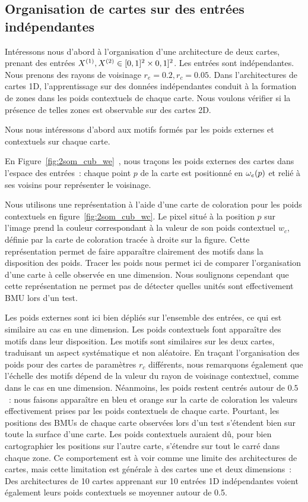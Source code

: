 \documentclass[../main]{subfiles}
\begin{document}
\subsection{Organisation de cartes sur des entrées indépendantes}

Intéressons nous d'abord à l'organisation d'une architecture de deux cartes, prenant des entrées $X^{({1})}, X^{({2})} \in [0,1]^2 \times 0,1]^2$. Les entrées sont indépendantes. Nous prenons des rayons de voisinage $r_e = 0.2, r_c = 0.05$.
Dans l'architectures de cartes 1D, l'apprentissage sur des données indépendantes conduit à la formation de zones dans les poids contextuels de chaque carte. Nous voulons vérifier si la présence de telles zones est observable sur des cartes 2D.

Nous nous intéressons d'abord aux motifs formés par les poids externes et contextuels sur chaque carte.

En Figure~\ref{fig:2som_cub_we}~, nous traçons les poids externes des cartes dans l'espace des entrées~: chaque point $p$ de la carte est positionné en $\omega_e(p)$ et relié à ses voisins pour représenter le voisinage.

Nous utilisons une représentation à l'aide d'une carte de coloration pour les poids contextuels en figure~\ref{fig:2som_cub_wc}. Le pixel situé à la position $p$ sur l'image prend la couleur correspondant à la valeur de son poids contextuel $w_c$, définie par la carte de coloration tracée à droite sur la figure.
Cette représentation permet de faire apparaître clairement des motifs dans la disposition des poids.
Tracer les poids nous permet ici de comparer l'organisation d'une carte à celle observée en une dimension. Nous soulignons cependant que cette représentation ne permet pas de détecter quelles unités sont effectivement BMU lors d'un test.

Les poids externes sont ici bien dépliés sur l'ensemble des entrées, ce qui est similaire au cas en une dimension.
Les poids contextuels font apparaître des motifs dans leur disposition. 
Les motifs sont similaires sur les deux cartes, traduisant un aspect systématique et non aléatoire.
En traçant l'organisation des poids pour des cartes de paramètres $r_c$ différents, nous remarquons également que l'échelle des motifs dépend de la valeur du rayon de voisinage contextuel, comme dans le cas en une dimension.
Néanmoins, les poids restent centrés autour de $0.5$~: nous faisons apparaître en bleu et orange sur la carte de coloration les valeurs effectivement prises par les poids contextuels de chaque carte. 
Pourtant, les positions des BMUs de chaque carte observées lors d'un test s'étendent bien sur toute la surface d'une carte. Les poids contextuels auraient dû, pour bien cartographier les positions sur l'autre carte, s'étendre sur tout le carré dans chaque zone.
Ce comportement est à voir comme une limite des architectures de cartes, mais cette limitation est générale à des cartes une et deux dimensions~:  Des architectures de 10 cartes apprenant sur 10 entrées 1D indépendantes voient également leurs poids contextuels se moyenner autour de 0.5.
\end{document}
